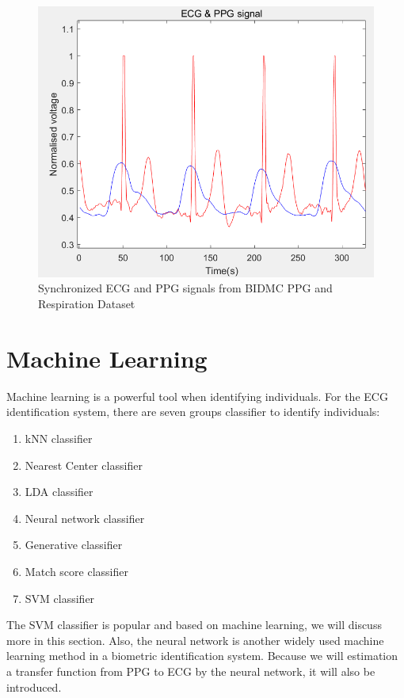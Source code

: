 \documentclass[a4paper,12pt]{article}
\begin{document}
\begin{figure}[H]
\centering
\includegraphics[width = .8\textwidth]{ecg_ppg.PNG}
\caption{Synchronized ECG and PPG signals from BIDMC PPG and Respiration Dataset \autocite{PhysioNet}}
\label{fig:ppg_ecg}
\end{figure}

\section{Machine Learning}
Machine learning is a powerful tool when identifying individuals. For the ECG identification system, there are seven groups classifier to identify individuals:
\begin{enumerate}
    \item kNN classifier
    \item Nearest Center classifier
    \item LDA classifier
    \item Neural network classifier
    \item Generative classifier
    \item Match score classifier
    \item SVM classifier
\end{enumerate}
The SVM classifier is popular and based on machine learning, we will discuss more in this section. Also, the neural network is another widely used machine learning method in a biometric identification system. Because we will estimation a transfer function from PPG to ECG by the neural network, it will also be introduced.
\end{document}
